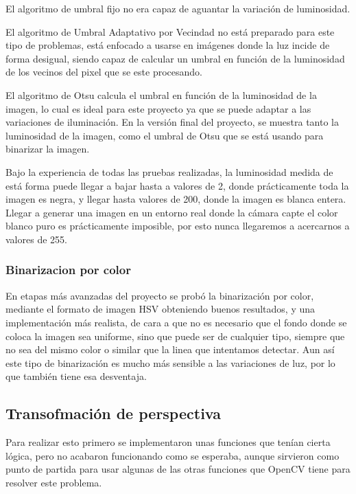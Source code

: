El algoritmo de umbral fijo no era capaz de aguantar la variación de luminosidad. 

El algoritmo de Umbral Adaptativo por Vecindad no está preparado para este tipo de problemas, está enfocado a usarse en imágenes donde la luz incide de forma desigual, siendo capaz de calcular un umbral en función de la luminosidad de los vecinos del pixel que se este procesando.

El algoritmo de Otsu calcula el umbral en función de la luminosidad de la imagen, lo cual es ideal para este proyecto ya que se puede adaptar a las variaciones de iluminación. En la versión final del proyecto, se muestra tanto la luminosidad de la imagen, como el umbral de Otsu que se está usando para binarizar la imagen.


Bajo la experiencia de todas las pruebas realizadas, la luminosidad medida de está forma puede llegar a bajar hasta a valores de 2, donde prácticamente toda la imagen es negra, y llegar hasta valores de 200, donde la imagen es blanca entera. Llegar a generar una imagen en un entorno real donde la cámara capte el color blanco puro es prácticamente imposible, por esto nunca llegaremos a acercarnos a valores de 255. 

\subsubsection{Binarizacion por color}

En etapas más avanzadas del proyecto se probó la binarización por color, mediante el formato de imagen HSV obteniendo buenos resultados, y una implementación más realista, de cara a que no es necesario que el fondo donde se coloca la imagen sea uniforme, sino que puede ser de cualquier tipo, siempre que no sea del mismo color o similar que la linea que intentamos detectar. Aun así este tipo de binarización es mucho más sensible a las variaciones de luz, por lo que también tiene esa desventaja.

\subsection{Transofmación de perspectiva}
Para realizar esto primero se implementaron unas funciones que tenían cierta lógica, pero no acabaron funcionando como se esperaba, aunque sirvieron como punto de partida para usar algunas de las otras funciones que OpenCV tiene para resolver este problema.

